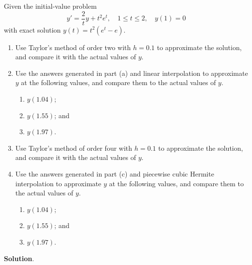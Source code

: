 \documentclass[11pt]{article}
\theoremstyle{break}
\numberwithin{equation}{theorem}
\begin{document}
\newpage
\begin{problem}\label{problem 6} %
    Given the initial-value problem $$y'=\dfrac{2}{t}y+t^2e^t, \quad 1\leq t\leq 2, \quad y(1)=0$$ with exact solution $y(t)=t^2(e^t-e)$.
    \begin{enumerate}
        \item Use Taylor's method of order two with $h = 0.1$ to approximate the solution, and compare it with the actual values of $y$.
        \item Use the answers generated in part (a) and linear interpolation to approximate $y$ at the following values, and compare them to the actual values of $y$.
        \begin{enumerate}[label=\roman*.]
            \item $y(1.04)$;
            \item $y(1.55)$; and
            \item $y(1.97)$.
        \end{enumerate}
        \item Use Taylor's method of order four with $h = 0.1$ to approximate the solution, and compare it with the actual values of $y$.
        \item Use the answers generated in part (c) and piecewise cubic Hermite interpolation to approximate $y$ at the following values, and compare them to the actual values of $y$.
        \begin{enumerate}[label=\roman*.]
            \item $y(1.04)$;
            \item $y(1.55)$; and
            \item $y(1.97)$.
        \end{enumerate}
    \end{enumerate}
\end{problem}
\textbf{Solution}. 
\end{document}
